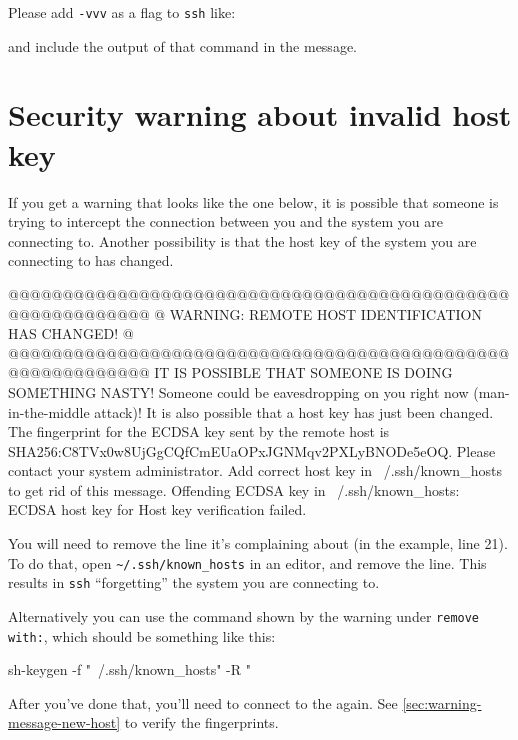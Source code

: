 \else
Please add \lstinline|-vvv| as a flag to \lstinline|ssh| like:

\begin{prompt}
\end{prompt}

and include the output of that command in the message.
\fi

\section{Security warning about invalid host key}
\label{sec:security-warning-invald-host-key}

If you get a warning that looks like the one below, it is possible
that someone is trying to intercept the connection between you and the system you are connecting to.
Another possibility is that the host key of the system you are connecting to has changed.

\ifmacORlinux

\begin{prompt}
@@@@@@@@@@@@@@@@@@@@@@@@@@@@@@@@@@@@@@@@@@@@@@@@@@@@@@@@@@@
@    WARNING: REMOTE HOST IDENTIFICATION HAS CHANGED!     @
@@@@@@@@@@@@@@@@@@@@@@@@@@@@@@@@@@@@@@@@@@@@@@@@@@@@@@@@@@@
IT IS POSSIBLE THAT SOMEONE IS DOING SOMETHING NASTY!
Someone could be eavesdropping on you right now (man-in-the-middle attack)!
It is also possible that a host key has just been changed.
The fingerprint for the ECDSA key sent by the remote host is
SHA256:C8TVx0w8UjGgCQfCmEUaOPxJGNMqv2PXLyBNODe5eOQ.
Please contact your system administrator.
Add correct host key in ~/.ssh/known_hosts to get rid of this message.
Offending ECDSA key in ~/.ssh/known_hosts:%
ECDSA host key for %
Host key verification failed.
\end{prompt}

You will need to remove the line it's complaining about (in the example, line 21).
To do that, open \lstinline|~/.ssh/known_hosts| in an editor, and remove the line. This
results in \lstinline|ssh| ``forgetting'' the system you are connecting to.

Alternatively you can use the command shown by the warning under \lstinline|remove with:|,
which should be something like this:
\begin{prompt}
sh-keygen -f "~/.ssh/known_hosts" -R "%
\end{prompt}

After you've done that, you'll need to connect to the \hpc again.
See \autoref{sec:warning-message-new-host} to verify the fingerprints.

